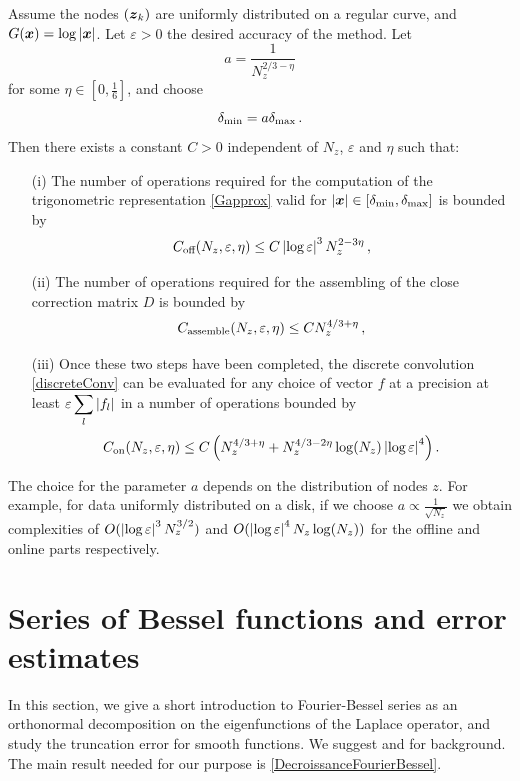 \documentclass[main]{subfiles}
\begin{document}
\begin{theorem} Assume the nodes $(\boldsymbol{z}_k)$ are uniformly distributed on a regular curve, and $G(\boldsymbol{x}) = \log \left\lvert \boldsymbol{x} \right\rvert$. Let $\varepsilon > 0$ the desired accuracy of the method. Let 
	\[a =\dfrac{1}{N_z^{2/3 - \eta}}\]
	for some $\eta \in \left[0,\frac{1}{6}\right]$, and choose 
	\[\delta_{\min} = a \delta_{\max} \,.\] 
	Then there exists a constant $C>0$ independent of $N_z$, $\varepsilon$ and $\eta$ such that:
	\label{The:GlobalComplexity}
	\begin{itemize}
		\item[(i)] The number of operations required for the computation of the trigonometric representation \eqref{Gapprox} valid for $\left\lvert \boldsymbol{x} \right\rvert \in [\delta_{\min},\delta_{\max}]$  is bounded by 
		\[ C_{\textup{off}}(N_z,\varepsilon,\eta) \leq C \left\lvert \log \varepsilon \right\rvert^3 N_z^{2 - 3\eta}\,,\]
		\item[(ii)] The number of operations required for the assembling of the close correction matrix $D$ is bounded by
		\[C_{\textup{assemble}}(N_z,\varepsilon,\eta)\leq C  N_z^{4/3 + \eta}\,,\]
		\item[(iii)] Once these two steps have been completed, the discrete convolution \eqref{discreteConv} can be evaluated for any choice of vector $f$ at a precision at least $\varepsilon \displaystyle\sum_l \left\lvert f_l \right\rvert$ in a number of operations bounded by
		\[C_{\textup{on}}(N_z,\varepsilon,\eta) \leq C \left(  N_z ^{4/3 + \eta} + N_z^{4/3 - 2\eta} \log(N_z) \left\lvert \log \varepsilon \right\rvert^4 \right).\] 
	\end{itemize} 
\end{theorem}

The choice for the parameter $a$ depends on the distribution of nodes $z$. For example, for data uniformly distributed on a disk, if we choose $a \propto \frac{1}{\sqrt{N_z}}$ we obtain complexities of $O(\left\lvert \log \varepsilon \right\rvert^3  N_z^{3/2})$ and $O(\left\lvert \log \varepsilon \right\rvert^4 N_z\log(N_z))$ for the offline and online parts respectively. 



\section{Series of Bessel functions and error estimates}
\label{sec:FourierBesselSeries}
In this section, we give a short introduction to Fourier-Bessel series as an orthonormal decomposition on the eigenfunctions of the Laplace operator, and study the truncation error for smooth functions. We suggest \cite{abramowitz1964handbook,NIST:DLMF} and \cite[chap. 18]{watson1995treatise} for background. The main result needed for our purpose is \autoref{DecroissanceFourierBessel}. 
\end{document}
